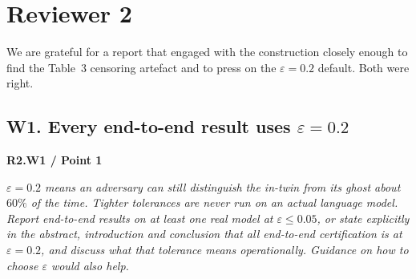 \documentclass[11pt,a4paper]{article}
\newcommand{\eps}{\varepsilon}
\newenvironment{point}[1]{%
  \par\medskip\noindent\textbf{\color{rcol}#1}\par\nopagebreak\smallskip\begingroup
  \color{rcol}\itshape}{\endgroup\par}
\begin{document}
\clearpage
\section*{Reviewer 2}

\noindent We are grateful for a report that engaged with the construction closely
enough to find the Table~3 censoring artefact and to press on the $\eps=0.2$ default.
Both were right.

\subsection*{W1. Every end-to-end result uses $\eps = 0.2$}

\begin{point}{R2.W1 / Point 1}
$\eps=0.2$ means an adversary can still distinguish the in-twin from its ghost about
$60\%$ of the time. Tighter tolerances are never run on an actual language model. Report
end-to-end results on at least one real model at $\eps \le 0.05$, or state explicitly in
the abstract, introduction and conclusion that all end-to-end certification is at
$\eps = 0.2$, and discuss what that tolerance means operationally. Guidance on how to
choose $\eps$ would also help.
\end{point}
\end{document}
